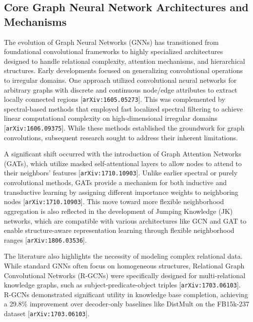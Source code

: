 \documentclass[11pt]{article}
\begin{document}
\subsection{Core Graph Neural Network Architectures and Mechanisms}

The evolution of Graph Neural Networks (GNNs) has transitioned from foundational convolutional frameworks to highly specialized architectures designed to handle relational complexity, attention mechanisms, and hierarchical structures. Early developments focused on generalizing convolutional operations to irregular domains. One approach utilized convolutional neural networks for arbitrary graphs with discrete and continuous node/edge attributes to extract locally connected regions [\texttt{arXiv:1605.05273}]. This was complemented by spectral-based methods that employed fast localized spectral filtering to achieve linear computational complexity on high-dimensional irregular domains [\texttt{arXiv:1606.09375}]. While these methods established the groundwork for graph convolutions, subsequent research sought to address their inherent limitations.

A significant shift occurred with the introduction of Graph Attention Networks (GATs), which utilize masked self-attentional layers to allow nodes to attend to their neighbors' features [\texttt{arXiv:1710.10903}]. Unlike earlier spectral or purely convolutional methods, GATs provide a mechanism for both inductive and transductive learning by assigning different importance weights to neighboring nodes [\texttt{arXiv:1710.10903}]. This move toward more flexible neighborhood aggregation is also reflected in the development of Jumping Knowledge (JK) networks, which are compatible with various architectures like GCN and GAT to enable structure-aware representation learning through flexible neighborhood ranges [\texttt{arXiv:1806.03536}].

The literature also highlights the necessity of modeling complex relational data. While standard GNNs often focus on homogeneous structures, Relational Graph Convolutional Networks (R-GCNs) were specifically designed for multi-relational knowledge graphs, such as subject-predicate-object triples [\texttt{arXiv:1703.06103}]. R-GCNs demonstrated significant utility in knowledge base completion, achieving a 29.8\% improvement over decoder-only baselines like DistMult on the FB15k-237 dataset [\texttt{arXiv:1703.06103}].
\end{document}
